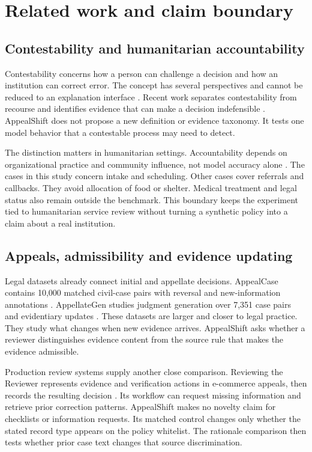 \documentclass{article}
\begin{document}
\section{Related work and claim boundary}

\subsection{Contestability and humanitarian accountability}

Contestability concerns how a person can challenge a decision and how an institution can correct error. The concept has several perspectives and cannot be reduced to an explanation interface \citep{lyons2021contestability}. Recent work separates contestability from recourse and identifies evidence that can make a decision indefensible \citep{freiesleben2026contestability}. AppealShift does not propose a new definition or evidence taxonomy. It tests one model behavior that a contestable process may need to detect.

The distinction matters in humanitarian settings. Accountability depends on organizational practice and community influence, not model accuracy alone \citep{chs2024standard}. The cases in this study concern intake and scheduling. Other cases cover referrals and callbacks. They avoid allocation of food or shelter. Medical treatment and legal status also remain outside the benchmark. This boundary keeps the experiment tied to humanitarian service review without turning a synthetic policy into a claim about a real institution.

\subsection{Appeals, admissibility and evidence updating}

Legal datasets already connect initial and appellate decisions. AppealCase contains 10,000 matched civil-case pairs with reversal and new-information annotations \citep{huang2025appealcase}. AppellateGen studies judgment generation over 7,351 case pairs and evidentiary updates \citep{yang2026appellategen}. These datasets are larger and closer to legal practice. They study what changes when new evidence arrives. AppealShift asks whether a reviewer distinguishes evidence content from the source rule that makes the evidence admissible.

Production review systems supply another close comparison. Reviewing the Reviewer represents evidence and verification actions in e-commerce appeals, then records the resulting decision \citep{du2026reviewer}. Its workflow can request missing information and retrieve prior correction patterns. AppealShift makes no novelty claim for checklists or information requests. Its matched control changes only whether the stated record type appears on the policy whitelist. The rationale comparison then tests whether prior case text changes that source discrimination.
\end{document}
